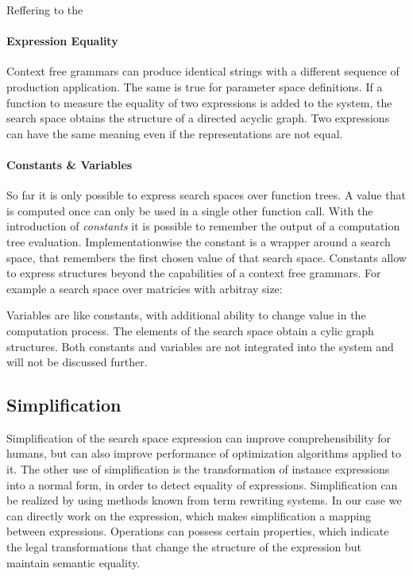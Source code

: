 \documentclass[english]{article}
\begin{document}
Reffering to the

\paragraph{Expression Equality}
Context free grammars can produce identical strings with a different sequence of production application. The same is true for parameter space definitions.
If a function to measure the equality of two expressions is added to the system, the search space obtains the structure of a directed acyclic graph.
Two expressions can have the same meaning even if the representations are not equal.

\paragraph{Constants \& Variables}
So far it is only possible to express search spaces over function trees.
A value that is computed once can only be used in a single other function call. With the introduction of \textit{constants} it is possible to remember the output of a computation tree evaluation. Implementationwise the constant is a wrapper around a search space, that remembers the first chosen value of that search space.
Constants allow to express structures beyond the capabilities of a context free grammars. For example a search space over matricies with arbitray size:

Variables are like constants, with additional ability to change value in the computation process. The elements of the search space obtain a cylic graph structures.
Both constants and variables are not integrated into the system and will not be discussed further.

\subsection{Simplification}
Simplification of the search space expression can improve comprehensibility for humans, but can also improve performance of optimization algorithms applied to it. The other use of simplification is the transformation of instance expressions into a normal form, in order to detect equality of expressions.
Simplification can be realized by using methods known from term rewriting systems. In our case we can directly work on the expression, which makes simplification a mapping between expressions.
Operations can possess certain properties, which indicate the legal transformations that change the structure of the expression but maintain semantic equality.
\end{document}
